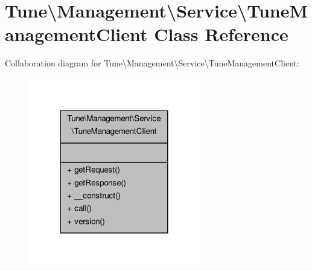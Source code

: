 \hypertarget{classTune_1_1Management_1_1Service_1_1TuneManagementClient}{\section{Tune\textbackslash{}Management\textbackslash{}Service\textbackslash{}Tune\-Management\-Client Class Reference}
\label{classTune_1_1Management_1_1Service_1_1TuneManagementClient}
}


Collaboration diagram for Tune\textbackslash{}Management\textbackslash{}Service\textbackslash{}Tune\-Management\-Client\-:
\nopagebreak
\begin{figure}[H]
\begin{center}
\leavevmode
\includegraphics[width=212pt]{classTune_1_1Management_1_1Service_1_1TuneManagementClient__coll__graph}
\end{center}
\end{figure}
